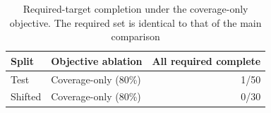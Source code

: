 \begin{table}[t]
  \centering
  \caption{Required-target completion under the coverage-only objective. The required set is identical to that of the main comparison}
  \label{tab:required-objective}
  \renewcommand{\arraystretch}{1.08}
  \setlength{\tabcolsep}{5pt}
  \footnotesize
  \begin{tabular}{@{}llr@{}}
    \toprule
    Split & Objective ablation & All required complete \\
    \midrule
    Test & Coverage-only (80\%) & 1/50 \\
    Shifted & Coverage-only (80\%) & 0/30 \\
    \bottomrule
  \end{tabular}
\end{table}
